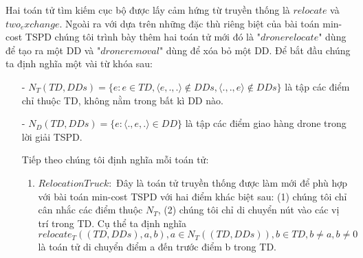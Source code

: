 \documentclass[a4paper,12pt]{report}
\begin{document}
Hai toán tử tìm kiếm cục bộ được lấy cảm hứng từ truyền thống là $relocate$ và $two_exchange$. Ngoài ra với dựa trên những đặc thù riêng biệt của bài toán min-cost TSPD chúng tôi trình bày thêm hai toán tử mới đó là "$drone relocate$" dùng để tạo ra một DD và "$drone removal$" dùng để xóa bỏ một DD. Để bắt đầu chúng ta định nghĩa một vài từ khóa sau:
\begin{itemize}
\item[-] $N_T(TD,DDs)=\{e:e \in TD,\langle e,.,. \rangle \notin DDs,\langle .,.,e \rangle \notin DDs\}$ là tập các điểm chỉ thuộc TD, không nằm trong bất kì DD nào.
\item[-] $N_D(TD,DDs)=\{e: \langle .,e,. \rangle \in DD\}$ là tập các điểm giao hàng drone trong lời giải TSPD.

Tiếp theo chúng tôi định nghĩa mỗi toán tử:
\begin{enumerate}
\item $Relocation Truck:$ Đây là toán tử truyền thống được làm mới để phù hợp với bài toán min-cost TSPD với hai điểm khác biệt sau: (1) chúng tôi chỉ cân nhắc các điểm thuộc $N_T$, (2) chúng tôi chỉ di chuyển nút vào các vị trí trong TD. Cụ thể ta định nghĩa
$$relocate_T((TD,DDs),a,b),a \in N_T((TD,DDs)),b \in TD, b \neq a, b \neq 0$$ 
là toán tử di chuyển điểm a đến trước điểm b trong TD.
\begin{figure}[H]


\end{figure}
\end{enumerate}
\end{itemize}
\end{document}
